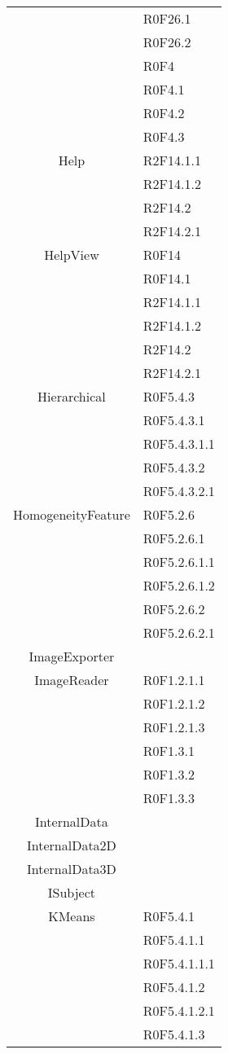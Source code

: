 \begin{center}
\begin{longtable}{|c|l|}
 & R0F26.1 \\
 & R0F26.2 \\
 & R0F4 \\
 & R0F4.1 \\
 & R0F4.2 \\
 & R0F4.3 \\
\hline 
Help & R2F14.1.1 \\
 & R2F14.1.2 \\
 & R2F14.2 \\
 & R2F14.2.1 \\
\hline 
HelpView & R0F14 \\
 & R0F14.1 \\
 & R2F14.1.1 \\
 & R2F14.1.2 \\
 & R2F14.2 \\
 & R2F14.2.1 \\
\hline 
Hierarchical & R0F5.4.3 \\
 & R0F5.4.3.1 \\
 & R0F5.4.3.1.1 \\
 & R0F5.4.3.2 \\
 & R0F5.4.3.2.1 \\
\hline 
HomogeneityFeature & R0F5.2.6 \\
 & R0F5.2.6.1 \\
 & R0F5.2.6.1.1 \\
 & R0F5.2.6.1.2 \\
 & R0F5.2.6.2 \\
 & R0F5.2.6.2.1 \\
\hline 
ImageExporter &  \\
\hline 
ImageReader & R0F1.2.1.1 \\
 & R0F1.2.1.2 \\
 & R0F1.2.1.3 \\
 & R0F1.3.1 \\
 & R0F1.3.2 \\
 & R0F1.3.3 \\
\hline 
InternalData &  \\
\hline 
InternalData2D &  \\
\hline 
InternalData3D &  \\
\hline 
ISubject &  \\
\hline 
KMeans & R0F5.4.1 \\
 & R0F5.4.1.1 \\
 & R0F5.4.1.1.1 \\
 & R0F5.4.1.2 \\
 & R0F5.4.1.2.1 \\
 & R0F5.4.1.3 \\

\end{longtable}
\end{center}
